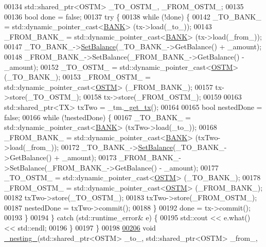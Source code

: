 \begin{DoxyCode}
00134     std::shared\_ptr<OSTM> \_TO\_OSTM\_, \_FROM\_OSTM\_;
00135 
00136     \textcolor{keywordtype}{bool} done = \textcolor{keyword}{false};
00137     \textcolor{keywordflow}{try} \{
00138         \textcolor{keywordflow}{while} (!done) \{
00142             \_TO\_BANK\_ = std::dynamic\_pointer\_cast<\hyperlink{class_b_a_n_k}{BANK}> (tx->load(\_to\_));
00143             \_FROM\_BANK\_ = std::dynamic\_pointer\_cast<\hyperlink{class_b_a_n_k}{BANK}> (tx->load(\_from\_));
00147             \_TO\_BANK\_->\hyperlink{class_b_a_n_k_ae3e45b407bf8ec7175662442ea24b7c0_ae3e45b407bf8ec7175662442ea24b7c0}{SetBalance}(\_TO\_BANK\_->GetBalance() + \_amount);
00148             \_FROM\_BANK\_->SetBalance(\_FROM\_BANK\_->GetBalance() - \_amount);
00152             \_TO\_OSTM\_ = std::dynamic\_pointer\_cast<\hyperlink{class_o_s_t_m}{OSTM}> (\_TO\_BANK\_);
00153             \_FROM\_OSTM\_ = std::dynamic\_pointer\_cast<\hyperlink{class_o_s_t_m}{OSTM}> (\_FROM\_BANK\_);
00157             tx->store(\_TO\_OSTM\_);
00158             tx->store(\_FROM\_OSTM\_);
00159 
00163             std::shared\_ptr<TX> txTwo = \_tm.\hyperlink{class_t_m_a41cb0226cc4080c931651b13f74a0075_a41cb0226cc4080c931651b13f74a0075}{\_get\_tx}();
00164 
00165             \textcolor{keywordtype}{bool} nestedDone = \textcolor{keyword}{false};
00166             \textcolor{keywordflow}{while} (!nestedDone) \{
00167                 \_TO\_BANK\_ = std::dynamic\_pointer\_cast<\hyperlink{class_b_a_n_k}{BANK}> (txTwo->load(\_to\_));
00168                 \_FROM\_BANK\_ = std::dynamic\_pointer\_cast<\hyperlink{class_b_a_n_k}{BANK}> (txTwo->load(\_from\_));
00172                 \_TO\_BANK\_->\hyperlink{class_b_a_n_k_ae3e45b407bf8ec7175662442ea24b7c0_ae3e45b407bf8ec7175662442ea24b7c0}{SetBalance}(\_TO\_BANK\_->GetBalance() + \_amount);
00173                 \_FROM\_BANK\_->SetBalance(\_FROM\_BANK\_->GetBalance() - \_amount);
00177                 \_TO\_OSTM\_ = std::dynamic\_pointer\_cast<\hyperlink{class_o_s_t_m}{OSTM}> (\_TO\_BANK\_);
00178                 \_FROM\_OSTM\_ = std::dynamic\_pointer\_cast<\hyperlink{class_o_s_t_m}{OSTM}> (\_FROM\_BANK\_);
00182                 txTwo->store(\_TO\_OSTM\_);
00183                 txTwo->store(\_FROM\_OSTM\_);
00187                 nestedDone = txTwo->commit();
00188             \}
00192             done = tx->commit();
00193         \}
00194     \} \textcolor{keywordflow}{catch} (std::runtime\_error& e) \{
00195         std::cout << e.what() << std::endl;
00196     \}
00197 \}
00198 
\hypertarget{main_8cpp_source.tex_l00206}{}\hyperlink{main_8cpp_a5675cb594d74aa1bf5e80233370ffd81_a5675cb594d74aa1bf5e80233370ffd81}{00206} \textcolor{keywordtype}{void} \hyperlink{main_8cpp_a5675cb594d74aa1bf5e80233370ffd81_a5675cb594d74aa1bf5e80233370ffd81}{\_nesting\_}(std::shared\_ptr<OSTM> \_to\_, std::shared\_ptr<OSTM> \_from\_, 

\end{DoxyCode}
